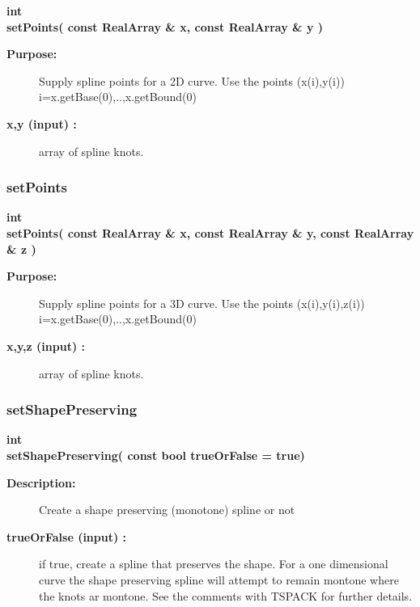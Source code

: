 \begin{flushleft} \textbf{%
int  \\ 
\settowidth{\SplineMappingIncludeArgIndent}{setPoints(}%
setPoints( const RealArray \& x, const RealArray \& y )
}\end{flushleft}
\begin{description}
\item[{\bf Purpose:}]  Supply spline points for a 2D curve. Use the points (x(i),y(i)) i=x.getBase(0),..,x.getBound(0)
\item[{\bf x,y (input) :}]  array of spline knots.
\end{description}
\subsubsection{setPoints}
 
\begin{flushleft} \textbf{%
int  \\ 
\settowidth{\SplineMappingIncludeArgIndent}{setPoints(}%
setPoints( const RealArray \& x, const RealArray \& y, const RealArray \& z )
}\end{flushleft}
\begin{description}
\item[{\bf Purpose:}]  Supply spline points for a 3D curve. Use the points (x(i),y(i),z(i)) i=x.getBase(0),..,x.getBound(0)
\item[{\bf x,y,z (input) :}]  array of spline knots.
\end{description}
\subsubsection{setShapePreserving}
 
\begin{flushleft} \textbf{%
int  \\ 
\settowidth{\SplineMappingIncludeArgIndent}{setShapePreserving(}%
setShapePreserving( const bool trueOrFalse  = true)
}\end{flushleft}
\begin{description}
\item[{\bf Description:}] 
   Create a shape preserving (monotone) spline or not
\item[{\bf trueOrFalse (input) :}]  if true, create a spline that preserves the shape. For a one dimensional
   curve the shape preserving spline will attempt to remain montone where the knots ar montone.
   See the comments with TSPACK for further details.

\end{description}
